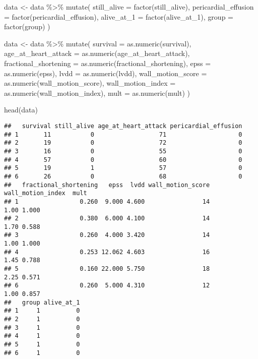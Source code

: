 \documentclass[
]{article}
\newenvironment{Shaded}{\begin{snugshade}}{\end{snugshade}}
\newcommand{\AttributeTok}[1]{\textcolor[rgb]{0.77,0.63,0.00}{#1}}
\newcommand{\FunctionTok}[1]{\textcolor[rgb]{0.00,0.00,0.00}{#1}}
\newcommand{\NormalTok}[1]{#1}
\newcommand{\OtherTok}[1]{\textcolor[rgb]{0.56,0.35,0.01}{#1}}
\newcommand{\SpecialCharTok}[1]{\textcolor[rgb]{0.00,0.00,0.00}{#1}}
\begin{document}
\begin{Shaded}
\begin{Highlighting}[]
\NormalTok{data }\OtherTok{\textless{}{-}}\NormalTok{ data }\SpecialCharTok{\%\textgreater{}\%}
  \FunctionTok{mutate}\NormalTok{(}
    \AttributeTok{still\_alive =} \FunctionTok{factor}\NormalTok{(still\_alive),}
    \AttributeTok{pericardial\_effusion =} \FunctionTok{factor}\NormalTok{(pericardial\_effusion),}
    \AttributeTok{alive\_at\_1 =} \FunctionTok{factor}\NormalTok{(alive\_at\_1),}
    \AttributeTok{group =} \FunctionTok{factor}\NormalTok{(group)}
\NormalTok{  )}

\NormalTok{data }\OtherTok{\textless{}{-}}\NormalTok{ data }\SpecialCharTok{\%\textgreater{}\%}
  \FunctionTok{mutate}\NormalTok{(}
    \AttributeTok{survival =} \FunctionTok{as.numeric}\NormalTok{(survival),}
    \AttributeTok{age\_at\_heart\_attack =} \FunctionTok{as.numeric}\NormalTok{(age\_at\_heart\_attack),}
    \AttributeTok{fractional\_shortening =} \FunctionTok{as.numeric}\NormalTok{(fractional\_shortening),}
    \AttributeTok{epss =} \FunctionTok{as.numeric}\NormalTok{(epss),}
    \AttributeTok{lvdd =} \FunctionTok{as.numeric}\NormalTok{(lvdd),}
    \AttributeTok{wall\_motion\_score =} \FunctionTok{as.numeric}\NormalTok{(wall\_motion\_score),}
    \AttributeTok{wall\_motion\_index =} \FunctionTok{as.numeric}\NormalTok{(wall\_motion\_index),}
    \AttributeTok{mult =} \FunctionTok{as.numeric}\NormalTok{(mult)}
\NormalTok{  )}

\FunctionTok{head}\NormalTok{(data)}
\end{Highlighting}
\end{Shaded}

\begin{verbatim}
##   survival still_alive age_at_heart_attack pericardial_effusion
## 1       11           0                  71                    0
## 2       19           0                  72                    0
## 3       16           0                  55                    0
## 4       57           0                  60                    0
## 5       19           1                  57                    0
## 6       26           0                  68                    0
##   fractional_shortening   epss  lvdd wall_motion_score wall_motion_index  mult
## 1                 0.260  9.000 4.600                14              1.00 1.000
## 2                 0.380  6.000 4.100                14              1.70 0.588
## 3                 0.260  4.000 3.420                14              1.00 1.000
## 4                 0.253 12.062 4.603                16              1.45 0.788
## 5                 0.160 22.000 5.750                18              2.25 0.571
## 6                 0.260  5.000 4.310                12              1.00 0.857
##   group alive_at_1
## 1     1          0
## 2     1          0
## 3     1          0
## 4     1          0
## 5     1          0
## 6     1          0
\end{verbatim}
\end{document}
